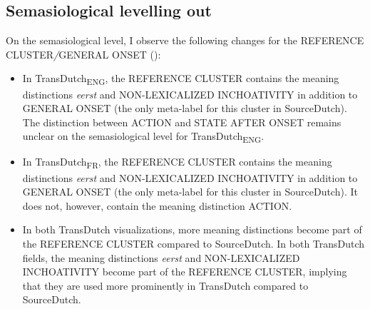 \subsection{\label{sec:4.5.1}  Semasiological levelling out}

On the semasiological level, I observe the following changes for the REFERENCE CLUSTER\textit{/}GENERAL ONSET ():


\begin{itemize}
\item  In TransDutch\textsubscript{ENG}, the REFERENCE CLUSTER contains the meaning distinctions \textit{eerst} and {NON-LEXICALIZED INCHOATIVITY} in addition to GENERAL ONSET (the only meta-label for this cluster in SourceDutch). The distinction between ACTION and STATE AFTER ONSET remains unclear on the semasiological level for TransDutch\textsubscript{ENG}.
\item  In TransDutch\textsubscript{FR}, the REFERENCE CLUSTER contains the meaning distinctions \textit{eerst} and {NON-LEXICALIZED INCHOATIVITY} in addition to GENERAL ONSET (the only meta-label for this cluster in SourceDutch). It does not, however, contain the meaning distinction ACTION.
\item  In both TransDutch visualizations, more meaning distinctions become part of the REFERENCE CLUSTER compared to SourceDutch. In both TransDutch fields, the meaning distinctions \textit{eerst} and {NON-LEXICALIZED INCHOATIVITY} become part of the REFERENCE CLUSTER, implying that they are used more prominently in TransDutch compared to SourceDutch.
\end{itemize}

